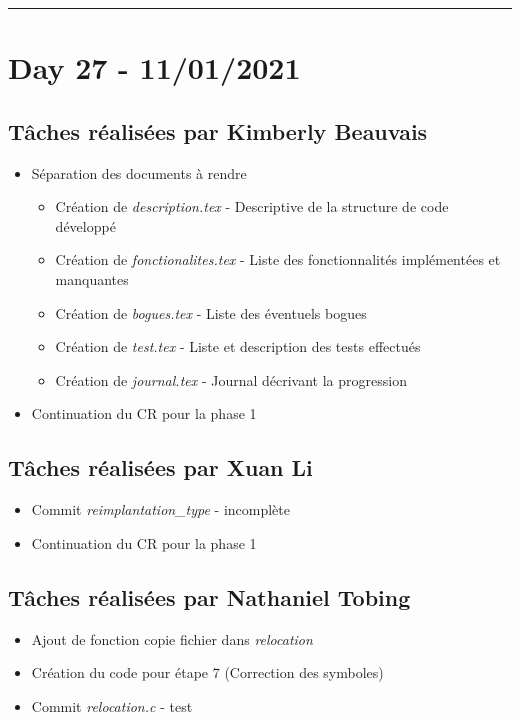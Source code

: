 \documentclass[11pt,letterpaper]{article}
\begin{document}
\noindent\rule{13cm}{0.4pt}

\section*{Day 27 - 11/01/2021}

\subsection*{Tâches réalisées par Kimberly Beauvais}
\begin{itemize}
    \item Séparation des documents à rendre
    \begin{itemize}
        \item Création de \textit{description.tex} - Descriptive de la structure 
        de code développé
        \item Création de \textit{fonctionalites.tex} - Liste des 
        fonctionnalités implémentées et manquantes
        \item Création de \textit{bogues.tex} - Liste des éventuels bogues 
        \item Création de \textit{test.tex} - Liste et description des tests effectués
        \item Création de \textit{journal.tex} - Journal décrivant la progression
    \end{itemize}
    \item Continuation du CR pour la phase 1
\end{itemize}

\subsection*{Tâches réalisées par Xuan Li}
\begin{itemize}
    \item Commit \textit{reimplantation\_type} - incomplète
    \item Continuation du CR pour la phase 1
\end{itemize}

\subsection*{Tâches réalisées par Nathaniel Tobing}
\begin{itemize}
    \item Ajout de fonction copie fichier dans \textit{relocation} 
    \item Création du code pour étape 7 (Correction des symboles)
    \item Commit \textit{relocation.c} - test
\end{itemize}
\end{document}
